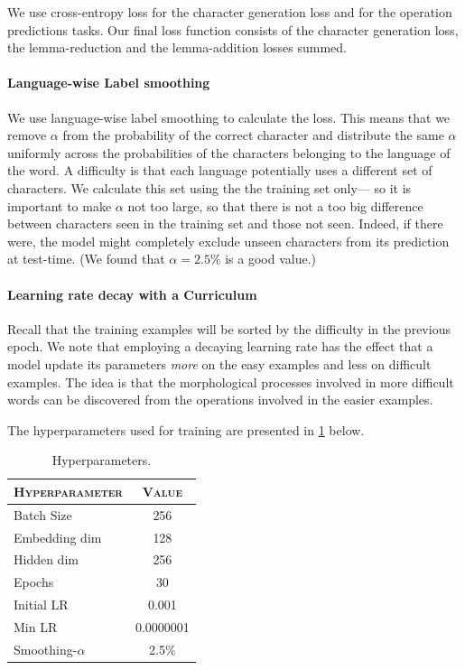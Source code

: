 \documentclass[11pt,a4paper]{article}
\newcommand\jp[1]{\textbf{JP: #1}}
\begin{document}
We use cross-entropy loss for the character generation loss and 
for the operation predictions tasks. Our final loss function consists
of the character generation loss, the lemma-reduction and the
lemma-addition losses summed.

\paragraph{Language-wise Label smoothing} We use language-wise label
smoothing to calculate the loss. This means that we remove $\alpha$
from the probability of the correct character and distribute the same
$\alpha$ uniformly across the probabilities of the characters
belonging to the language of the word. A difficulty is that each
language potentially uses a different set of characters. We calculate
this set using the the training set only--- so it is important to make
$\alpha$ not too large, so that there is not a too big difference
between characters seen in the training set and those not seen.
Indeed, if there were, the model might completely exclude unseen
characters from its prediction at test-time. (We found that
\(\alpha=2.5\%\) is a good value.)

\paragraph{Learning rate decay with a Curriculum} Recall that the training
examples will be sorted by the difficulty in the previous epoch.  We
note that employing a decaying learning rate has the effect that a
model update its parameters \emph{more} on the easy examples and
less on difficult examples. The idea is that the morphological
processes involved in more difficult words can be discovered from the
operations involved in the easier examples.

The hyperparameters used for training are presented in \cref{tab:hp} below.
\begin{table}[h]	
\centering
\begin{tabular}{lc}
\textsc{Hyperparameter} & \textsc{Value} \\
  \hline
  Batch Size & 256 \\
  Embedding dim & 128 \\
  Hidden dim & 256 \\
  Epochs & 30 \\
  Initial LR & 0.001 \\
  Min LR & 0.0000001 \\
  Smoothing-$\alpha$ & 2.5\% \\
\end{tabular} 
\caption{Hyperparameters.}
\label{tab:hp}
\end{table}
\end{document}

